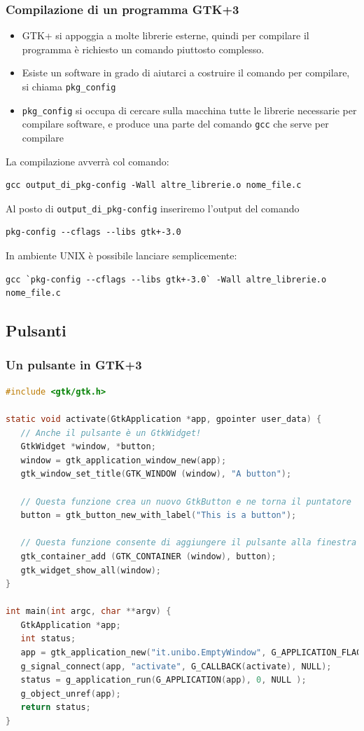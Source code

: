 \documentclass{beamer}
\begin{document}
\begin{frame}[fragile]
\frametitle{Compilazione di un programma GTK+3}
\begin{itemize}
 \item GTK+ si appoggia a molte librerie esterne, quindi per compilare il programma è richiesto un comando piuttosto complesso.
 \item Esiste un software in grado di aiutarci a costruire il comando per compilare, si chiama \texttt{pkg\_config}
 \item \texttt{pkg\_config} si occupa di cercare sulla macchina tutte le librerie necessarie per compilare software, e produce una parte del comando \texttt{gcc} che serve per compilare
\end{itemize}
La compilazione avverrà col comando:
\begin{verbatim}
gcc output_di_pkg-config -Wall altre_librerie.o nome_file.c
\end{verbatim}
Al posto di \texttt{output\_di\_pkg-config} inseriremo l'output del comando
\begin{verbatim}
pkg-config --cflags --libs gtk+-3.0
\end{verbatim}
In ambiente UNIX è possibile lanciare semplicemente:
\scriptsize
\begin{verbatim}
gcc `pkg-config --cflags --libs gtk+-3.0` -Wall altre_librerie.o nome_file.c
\end{verbatim}
\end{frame}

\subsection{Pulsanti}

\begin{frame}[fragile]
\frametitle{Un pulsante in GTK+3}
\begin{lstlisting}[language=C]
#include <gtk/gtk.h>

static void activate(GtkApplication *app, gpointer user_data) {
   // Anche il pulsante è un GtkWidget!
   GtkWidget *window, *button;
   window = gtk_application_window_new(app);
   gtk_window_set_title(GTK_WINDOW (window), "A button");

   // Questa funzione crea un nuovo GtkButton e ne torna il puntatore
   button = gtk_button_new_with_label("This is a button");
   
   // Questa funzione consente di aggiungere il pulsante alla finestra
   gtk_container_add (GTK_CONTAINER (window), button);
   gtk_widget_show_all(window);
}

int main(int argc, char **argv) {
   GtkApplication *app;
   int status;
   app = gtk_application_new("it.unibo.EmptyWindow", G_APPLICATION_FLAGS_NONE);
   g_signal_connect(app, "activate", G_CALLBACK(activate), NULL);
   status = g_application_run(G_APPLICATION(app), 0, NULL );
   g_object_unref(app);
   return status;
}
\end{lstlisting} 

\end{frame}
\end{document}
